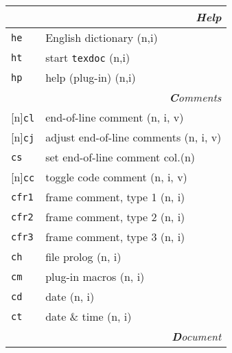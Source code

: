 \documentclass[oneside,10pt,landscape,DIV16]{scrartcl}
\newcommand{\Rep}{{\scriptsize{[n]}}}
\newcommand{\Map}[1] {\textbf{\textasciiacute}\texttt{#1}}
\begin{document}
\begin{multicols}{3}
\begin{center}
\begin{tabular}[]{|p{11mm}|p{60mm}|}
\hline
\multicolumn{2}{|r|}{\textsl{\textbf{H}elp}}\\[1.0ex]
\hline \Map{he}   & English dictionary              \hfill (n,i)\\
\hline \Map{ht}   & start \texttt{texdoc}           \hfill (n,i)\\
\hline \Map{hp}   & help (plug-in)                  \hfill (n,i)\\
\hline
\hline
\multicolumn{2}{|r|}{\textsl{\textbf{C}omments}}    \\[1.0ex]
\hline \Rep\Map{cl}   & end-of-line comment         \hfill (n, i, v)\\
\hline \Rep\Map{cj}   & adjust end-of-line comments \hfill (n, i, v)\\
\hline     \Map{cs}   & set end-of-line comment col.\hfill (n)      \\
%
\hline \Rep\Map{cc}   & toggle code comment         \hfill (n, i, v)\\
%
\hline     \Map{cfr1} & frame comment, type 1       \hfill (n, i)   \\
\hline     \Map{cfr2} & frame comment, type 2       \hfill (n, i)   \\
\hline     \Map{cfr3} & frame comment, type 3       \hfill (n, i)   \\
\hline     \Map{ch}   & file prolog                 \hfill (n, i)   \\
\hline     \Map{cm}   & plug-in macros              \hfill (n, i)   \\
\hline     \Map{cd}   & date                        \hfill (n, i)   \\
\hline     \Map{ct}   & date \& time                \hfill (n, i)   \\
\hline
\hline
\multicolumn{2}{|r|}{\textsl{\textbf{D}ocument}}                 \\[1.0ex]

\end{tabular}
\end{center}
\end{multicols}
\end{document}
